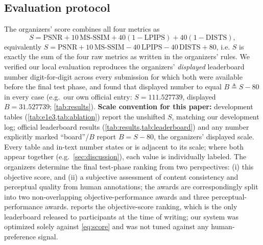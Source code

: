 \documentclass[runningheads]{llncs}
\begin{document}
\subsection{Evaluation protocol}
\label{sec:eval}
The organizers' score combines all four metrics as
\begin{equation}
S=\mathrm{PSNR}+10\,\mathrm{MS\mbox{-}SSIM}+40(1-\mathrm{LPIPS})+40(1-\mathrm{DISTS}),
\label{eq:score}
\end{equation}
equivalently $S = \mathrm{PSNR} + 10\,\mathrm{MS\mbox{-}SSIM} - 40\,\mathrm{LPIPS} - 40\,\mathrm{DISTS} + 80$, i.e. $S$ is exactly the sum of the four raw metrics as written in the organizers' rules. We verified our local evaluation reproduces the organizers' \emph{displayed} leaderboard number digit-for-digit across every submission for which both were available before the final test phase, and found that displayed number to equal $B \triangleq S - 80$ in every case (e.g.\ our own official entry: $S=111.527739$, displayed $B=31.527739$; \cref{tab:results}). \textbf{Scale convention for this paper:} development tables (\cref{tab:e1e3,tab:ablation}) report the unshifted $S$, matching our development log; official leaderboard results (\cref{tab:results,tab:leaderboard}) and any number explicitly marked ``board''/$B$ report $B=S-80$, the organizers' displayed scale. Every table and in-text number states or is adjacent to its scale; where both appear together (e.g.\ \cref{sec:discussion}), each value is individually labeled. The organizers determine the final test-phase ranking from two perspectives: (i) this objective score, and (ii) a subjective assessment of content consistency and perceptual quality from human annotations; the awards are correspondingly split into two non-overlapping objective-performance awards and three perceptual-performance awards.  reports the objective-score ranking, which is the only leaderboard released to participants at the time of writing; our system was optimized solely against \cref{eq:score} and was not tuned against any human-preference signal.
\end{document}
